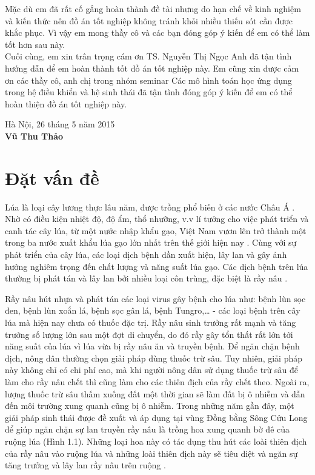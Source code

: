\documentclass[13pt]{extreport}
\begin{document}
\indent Mặc dù em đã rất cố gắng hoàn thành đề tài nhưng do hạn chế về kinh nghiệm và kiến thức nên đồ án tốt nghiệp không tránh khỏi nhiều thiếu sót cần được khắc phục. Vì vậy em mong thầy cô và các bạn đóng góp ý kiến để em có thể làm tốt hơn sau này.\\
\indent Cuối cùng, em xin trân trọng cám ơn TS. Nguyễn Thị Ngọc Anh đã tận tình hướng dẫn để em hoàn thành tốt đồ án tốt nghiệp này. Em cũng xin được cảm ơn các thầy cô, anh chị trong nhóm seminar Các mô hình toán học ứng dụng trong hệ điều khiển và hệ sinh thái đã tận tình đóng góp ý kiến để em có thể hoàn thiện đồ án tốt nghiệp này.\\
\begin{flushright}
Hà Nội, 26 tháng 5 năm 2015\\
\textbf{Vũ Thu Thảo}
\end{flushright}

\chapter{Đặt vấn đề}
{\indent Lúa là loại cây lương thực lâu năm, được trồng phổ biến ở các nước Châu Á \cite{tltk9}. Nhờ có điều kiện nhiệt độ, độ ẩm, thổ nhưỡng, v.v lí tưởng cho việc phát triển và canh tác cây lúa, từ một nước nhập khẩu gạo, Việt Nam vươn lên trở thành một trong ba nước xuất khẩu lúa gạo lớn nhất trên thế giới hiện nay \cite{tltk10}. Cùng với sự phát triển của cây lúa, các loại dịch bệnh dần xuất hiện, lây lan và gây ảnh hưởng nghiêm trọng đến chất lượng và năng suất lúa gạo. Các dịch bệnh trên lúa thường bị phát tán và lây lan bởi nhiều loại côn trùng, đặc biệt là rầy nâu \cite{tltk9}.}

Rầy nâu hút nhựa và phát tán các loại virus gây bệnh cho lúa như: bệnh lùn sọc đen, bệnh lùn xoắn lá, bệnh sọc gân lá, bệnh Tungro,…\cite{tltk7} - các loại bệnh trên cây lúa mà hiện nay chưa có thuốc đặc trị. Rầy nâu sinh trưởng rất mạnh và tăng trưởng số lượng lớn sau một đợt di chuyển, do đó rầy gây tổn thất rất lớn tới năng suất của lúa vì lúa vừa bị rầy nâu ăn và truyền bệnh. Để ngăn chặn bệnh dịch, nông dân thường chọn giải pháp dùng thuốc trừ sâu. Tuy nhiên, giải pháp này không chỉ có chi phí cao, mà khi người nông dân sử dụng thuốc trừ sâu để làm cho rầy nâu chết thì cũng làm cho các thiên địch của rầy chết theo. Ngoài ra, lượng thuốc trừ sâu thấm xuống đất một thời gian sẽ làm đất bị ô nhiễm và dẫn đến môi trường xung quanh cũng bị ô nhiễm. Trong những năm gần đây, một giải pháp sinh thái được đề xuất và áp dụng tại vùng Đồng bằng Sông Cửu Long để giúp ngăn chặn sự lan truyền rầy nâu là trồng hoa xung quanh bờ đê của ruộng lúa (Hình 1.1). Những loại hoa này có tác dụng thu hút các loài thiên địch của rầy nâu vào ruộng lúa và những loài thiên địch này sẽ tiêu diệt và ngăn sự tăng trưởng và lây lan rầy nâu trên ruộng \cite{tltk8}.
\end{document}
